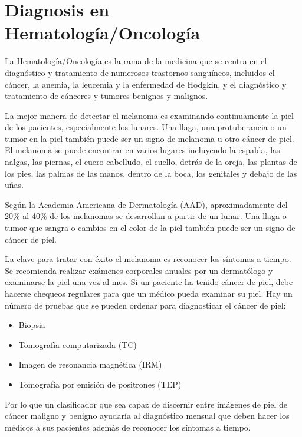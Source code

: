 
\section{Diagnosis en \\ Hematología/Oncología}
La Hematología/Oncología es la rama de la medicina que se centra en el diagnóstico y tratamiento de numerosos trastornos sanguíneos, incluidos el cáncer, la anemia, la leucemia y la enfermedad de Hodgkin, y el diagnóstico y tratamiento de cánceres y tumores benignos y malignos.

La mejor manera de detectar el melanoma es examinando continuamente la piel de los pacientes, especialmente los lunares. Una llaga, una protuberancia o un tumor en la piel también puede ser un signo de melanoma u otro cáncer de piel. El melanoma se puede encontrar en varios lugares incluyendo la espalda, las nalgas, las piernas, el cuero cabelludo, el cuello, detrás de la oreja, las plantas de los pies, las palmas de las manos, dentro de la boca, los genitales y debajo de las uñas. 

Según la Academia Americana de Dermatología (AAD), aproximadamente del 20\% al 40\% de los melanomas se desarrollan a partir de un lunar. Una llaga o tumor que sangra o cambios en el color de la piel también puede ser un signo de cáncer de piel. 

\pagestyle{fancy}
\fancyhf{}
La clave para tratar con éxito el melanoma es reconocer los síntomas a tiempo. Se recomienda realizar exámenes corporales anuales por un dermatólogo y examinarse la piel una vez al mes. Si un paciente ha tenido cáncer de piel, debe hacerse chequeos regulares para que un médico pueda examinar su piel.
Hay un número de pruebas que se pueden ordenar para diagnosticar el cáncer de piel: 
\begin{itemize}
\item Biopsia
\item Tomografía computarizada (TC)
\item Imagen de resonancia magnética (IRM)
\item Tomografía por emisión de positrones (TEP)
\end{itemize}
Por lo que un clasificador que sea capaz de discernir entre imágenes de piel de cáncer maligno y benigno ayudaría al diagnóstico mensual que deben hacer los médicos a sus pacientes además de reconocer los síntomas a tiempo.
\newpage

\pagestyle{fancy}
\fancyhf{}


